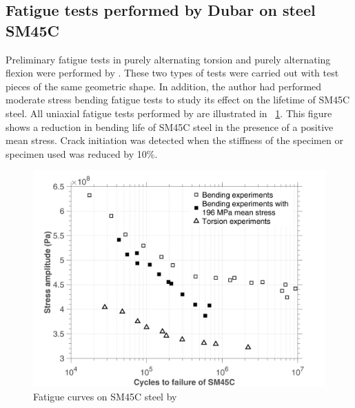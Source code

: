 \documentclass[3p,times,procedia,number]{elsarticle}
\newcommand{\figref}[1]{\figurename~\ref{#1}}
\begin{document}
\subsection{Fatigue tests performed by Dubar on steel SM45C}
Preliminary fatigue tests in purely alternating torsion and purely alternating flexion were performed by \cite{lee2013out}. These two types of tests were carried out with test pieces of the same geometric shape. In addition, the author had performed moderate stress bending fatigue tests to study its effect on the lifetime of SM45C steel. All uniaxial fatigue tests performed by \cite{lee2013out} are illustrated in \figref{fig.SM45CSN}. This figure shows a reduction in bending life of SM45C steel in the presence of a positive mean stress. Crack initiation was detected when the stiffness of the specimen or specimen used was reduced by 10\%.
\begin{figure}[!h]
	\centering
	\includegraphics[width=\textwidth]{figures//SM45C_SN.png} 
	\caption{Fatigue curves on SM45C steel by \cite{lee2013out}}
	\label{fig.SM45CSN}
\end{figure}
\end{document}
